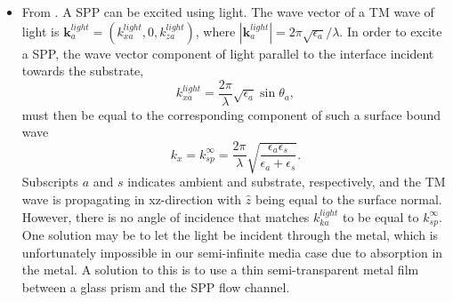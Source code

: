 \begin{itemize}
    \item From \cite{hans_arwin}. A SPP can be excited using light. The wave vector of a TM wave of light is $\mathbf{k}_a^{light} = (k_{xa}^{light},0,k_{za}^{light})$, where $|\mathbf{k}_a^{light}| =2\pi \sqrt{\epsilon_a}/\lambda$. In order to excite a SPP, the wave vector component of light parallel to the interface incident towards the substrate, 
    \begin{equation}
        k_{xa}^{light} = \frac{2\pi}{\lambda}\sqrt{\epsilon_a} \sin \theta_a ,
    \end{equation}
    must then be equal to the corresponding component of such a surface bound wave 
    \begin{equation}
        k_x = k_{sp}^\infty = \frac{2\pi}{\lambda}\sqrt{\frac{\epsilon_a\epsilon_s}{\epsilon_a+\epsilon_s}}.
    \end{equation} Subscripts $a$ and $s$ indicates ambient and substrate, respectively, and the TM wave is propagating in xz-direction with $\hat{z}$ being equal to the surface normal. However, there is no angle of incidence that matches $k_{ka}^{light}$ to be equal to $k_{sp}^\infty$. One solution may be to let the light be incident through the metal, which is unfortunately impossible in our semi-infinite media case due to absorption in the metal. A solution to this is to use a thin semi-transparent metal film between a glass prism and the SPP flow channel.
\end{itemize}
    

